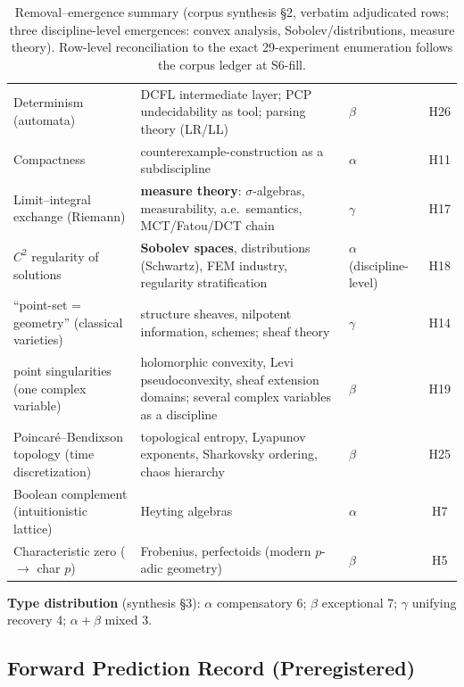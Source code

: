\begin{table}[h]
\begin{tabular}{lp{}lc}
Determinism (automata) & DCFL intermediate layer; PCP
undecidability as tool; parsing theory (LR/LL) & $\beta$ & H26 \\
Compactness & counterexample-construction as a subdiscipline &
$\alpha$ & H11 \\
Limit--integral exchange (Riemann) & \textbf{measure theory}:
$\sigma$-algebras, measurability, a.e.\ semantics, MCT/Fatou/DCT
chain & $\gamma$ & H17 \\
$C^2$ regularity of solutions & \textbf{Sobolev spaces},
distributions (Schwartz), FEM industry, regularity stratification &
$\alpha$ (discipline-level) & H18 \\
``point-set = geometry'' (classical varieties) & structure sheaves,
nilpotent information, schemes; sheaf theory & $\gamma$ & H14 \\
point singularities (one complex variable) & holomorphic convexity,
Levi pseudoconvexity, sheaf extension domains; several complex
variables as a discipline & $\beta$ & H19 \\
Poincar\'e--Bendixson topology (time discretization) & topological
entropy, Lyapunov exponents, Sharkovsky ordering, chaos hierarchy &
$\beta$ & H25 \\
Boolean complement (intuitionistic lattice) & Heyting algebras &
$\alpha$ & H7 \\
Characteristic zero ($\to$ char $p$) & Frobenius, perfectoids
(modern $p$-adic geometry) & $\beta$ & H5 \\
\bottomrule
\end{tabular}
\caption{Removal--emergence summary (corpus synthesis \S2, verbatim
adjudicated rows; three discipline-level emergences: convex analysis,
Sobolev/distributions, measure theory). Row-level reconciliation to
the exact 29-experiment enumeration follows the corpus ledger at
S6-fill.}
\label{tab:act3-summary}
\end{table}

\noindent\textbf{Type distribution} (synthesis \S3): $\alpha$
compensatory 6; $\beta$ exceptional 7; $\gamma$ unifying recovery 4;
$\alpha{+}\beta$ mixed 3.

\subsection{Forward Prediction Record (Preregistered)}\label{sec:act3-forward}


